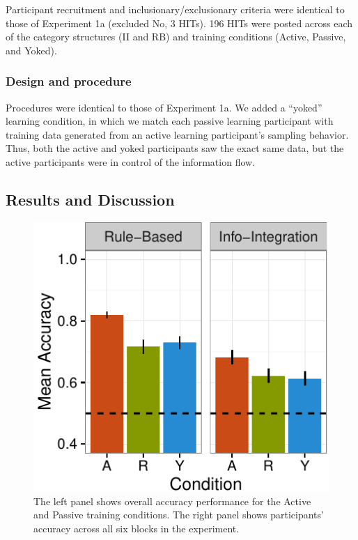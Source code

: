 \documentclass[10pt, letterpaper]{article}
\newenvironment{CodeChunk}{}{}
\begin{document}
Participant recruitment and inclusionary/exclusionary criteria were
identical to those of Experiment 1a (excluded No, 3 HITs). 196 HITs were
posted across each of the category structures (II and RB) and training
conditions (Active, Passive, and Yoked).

\subsubsection{Design and procedure}\label{design-and-procedure-1}

Procedures were identical to those of Experiment 1a. We added a
``yoked'' learning condition, in which we match each passive learning
participant with training data generated from an active learning
participant's sampling behavior. Thus, both the active and yoked
participants saw the exact same data, but the active participants were
in control of the information flow.

\subsection{Results and Discussion}\label{results-and-discussion-1}

\begin{CodeChunk}
\captionsetup{width=0.8\columnwidth}\begin{figure}[t]

{\centering \includegraphics{figs/rep1b-acc-plot-1} 

}

\caption[The left panel shows overall accuracy performance for the Active and Passive training conditions]{The left panel shows overall accuracy performance for the Active and Passive training conditions. The right panel shows participants' accuracy across all six blocks in the experiment.}\label{fig:rep1b-acc-plot}
\end{figure}
\end{CodeChunk}
\end{document}
